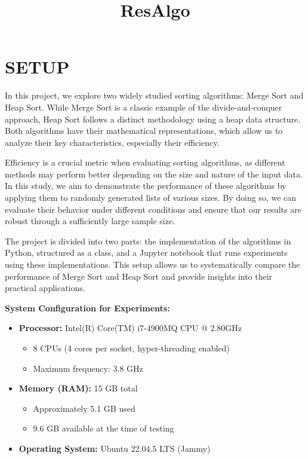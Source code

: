 \documentclass[11pt]{article}
\title{ResAlgo}
\providecommand{\tightlist}{%
      \setlength{\itemsep}{0pt}\setlength{\parskip}{0pt}}
\begin{document}
    
    \maketitle
    
    

    
    \hypertarget{setup}{%
\section{SETUP}\label{setup}}

    In this project, we explore two widely studied sorting algorithms: Merge
Sort and Heap Sort. While Merge Sort is a classic example of the
divide-and-conquer approach, Heap Sort follows a distinct methodology
using a heap data structure. Both algorithms have their mathematical
representations, which allow us to analyze their key characteristics,
especially their efficiency.

Efficiency is a crucial metric when evaluating sorting algorithms, as
different methods may perform better depending on the size and nature of
the input data. In this study, we aim to demonstrate the performance of
these algorithms by applying them to randomly generated lists of various
sizes. By doing so, we can evaluate their behavior under different
conditions and ensure that our results are robust through a sufficiently
large sample size.

The project is divided into two parts: the implementation of the
algorithms in Python, structured as a class, and a Jupyter notebook that
runs experiments using these implementations. This setup allows us to
systematically compare the performance of Merge Sort and Heap Sort and
provide insights into their practical applications.

    \textbf{System Configuration for Experiments:}

\begin{itemize}
\tightlist
\item
  \textbf{Processor:} Intel(R) Core(TM) i7-4900MQ CPU @ 2.80GHz

  \begin{itemize}
  \tightlist
  \item
    8 CPUs (4 cores per socket, hyper-threading enabled)\\
  \item
    Maximum frequency: 3.8 GHz
  \end{itemize}
\item
  \textbf{Memory (RAM):} 15 GB total

  \begin{itemize}
  \tightlist
  \item
    Approximately 5.1 GB used\\
  \item
    9.6 GB available at the time of testing
  \end{itemize}
\item
  \textbf{Operating System:} Ubuntu 22.04.5 LTS (Jammy)
\end{itemize}
\end{document}
